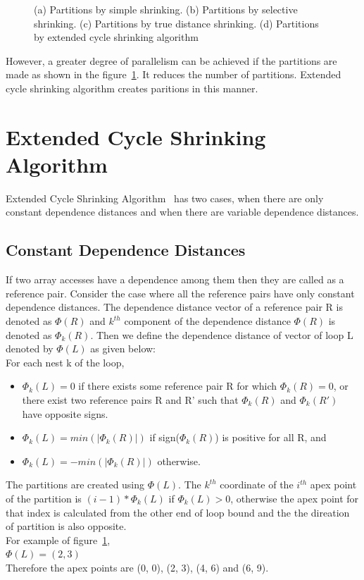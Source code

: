 \begin{figure}
\begin{subfigure}{0.45\textwidth}
  \caption{}
  \label{fig:extended}
\end{subfigure}
\caption{(a) Partitions by simple shrinking. (b) Partitions by selective shrinking. (c) Partitions by true distance shrinking. (d) Partitions by extended cycle shrinking algorithm}
\label{fig:cycle_shrinking_example}
\end{figure}

However, a greater degree of parallelism can be achieved if the partitions are made as shown in the figure~\ref{fig:extended}. It reduces the number of partitions.
Extended cycle shrinking algorithm creates paritions in this manner. \\


\section{Extended Cycle Shrinking Algorithm}

Extended Cycle Shrinking Algorithm~\cite{extended} has two cases, when there are only constant dependence distances and when there are variable dependence distances. \\

\subsection{Constant Dependence Distances}

If two array accesses have a dependence among them then they are called as a reference pair.
Consider the case where all the reference pairs have only constant dependence distances. The dependence distance vector of a reference pair R is denoted as $\Phi(R)$ and $k^{th}$ component of the dependence distance $\Phi(R)$ is denoted as $\Phi_{k}(R)$. Then we define the dependence distance of vector of loop L denoted by $\Phi(L)$ as given below: \\

For each nest k of the loop, 
\begin{itemize}
\item $\Phi_k(L) = 0$ if there exists some reference pair R for which $\Phi_k(R) = 0$, or there exist two reference pairs R and R' such that $\Phi_k(R)$ and $\Phi_k(R')$ have opposite signs. 
\item $\Phi_k(L) = min(|\Phi_k(R)|)$ if sign($\Phi_k(R)$) is positive for all R, and
\item $\Phi_k(L) = -min(|\Phi_k(R)|)$ otherwise.
\end{itemize}

The partitions are created using $\Phi(L)$. The $k^{th}$ coordinate of the $i^{th}$ apex point of the partition is $(i-1)*\Phi_k(L)$ if $\Phi_k(L) > 0$, otherwise the apex point for that index is calculated from the other end of loop bound and the the direation of partition is also opposite. \\

For example of figure~\ref{fig:extended}, \\
$\Phi(L) = (2, 3)$ \\
Therefore the apex points are (0, 0), (2, 3), (4, 6) and (6, 9). \\